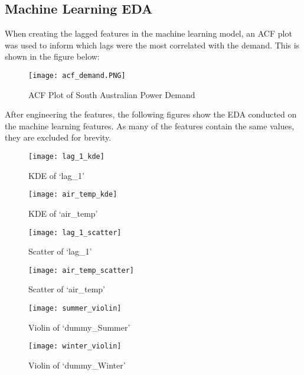 \documentclass[11pt]{article}
\begin{document}
\subsection{Machine Learning EDA}
\label{appendix:machine_learning_eda}

When creating the lagged features in the machine learning model, an ACF plot was used to inform which lags were the most correlated with the demand. This is shown in the figure below:

\begin{figure}[H]
\centering
\begin{minipage}{.5\textwidth}
  \centering
  \texttt{[image: acf\_demand.PNG]}
   \caption{ACF Plot of South Australian Power Demand}
   \label{fig:acf_demand}
\end{minipage}%
\end{figure}

\noindent After engineering the features, the following figures show the EDA conducted on the machine learning features. As many of the features contain the same values, they are excluded for brevity.

\begin{figure}[H]
\centering
\begin{minipage}{.5\textwidth}
  \centering
  \texttt{[image: lag\_1\_kde]}
   \caption{KDE of `lag\_1'}
   \label{fig:lag_1_kde}
\end{minipage}%
\begin{minipage}{.5\textwidth}
  \centering
  \texttt{[image: air\_temp\_kde]}
   \caption{KDE of `air\_temp'}
   \label{fig:air_temp_kde}
\end{minipage}%
\end{figure}

\begin{figure}[H]
\centering
\begin{minipage}{.5\textwidth}
  \centering
  \texttt{[image: lag\_1\_scatter]}
   \caption{Scatter of `lag\_1'}
   \label{fig:lag_1_scatter}
\end{minipage}%
\begin{minipage}{.5\textwidth}
  \centering
  \texttt{[image: air\_temp\_scatter]}
   \caption{Scatter of `air\_temp'}
   \label{fig:air_temp_scatter}
\end{minipage}%
\end{figure}

\begin{figure}[H]
\centering
\begin{minipage}{.5\textwidth}
  \centering
  \texttt{[image: summer\_violin]}
   \caption{Violin of `dummy\_Summer'}
   \label{fig:summer_violin}
\end{minipage}%
\begin{minipage}{.5\textwidth}
  \centering
  \texttt{[image: winter\_violin]}
   \caption{Violin of `dummy\_Winter'}
   \label{fig:winter_violin}
\end{minipage}%
\end{figure}
\end{document}
